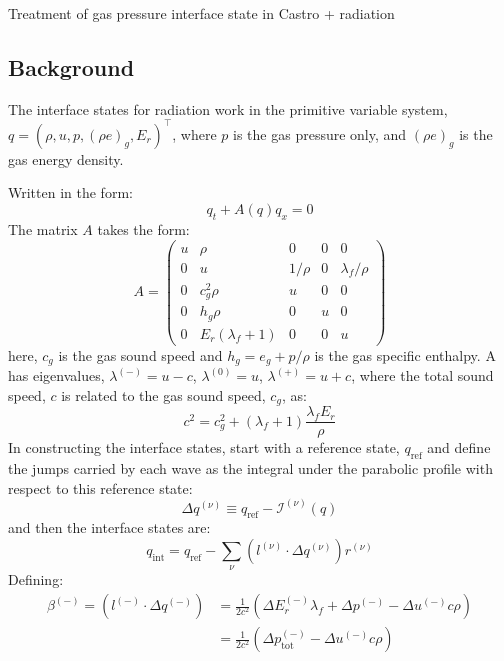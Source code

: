\documentclass[12pt]{article}
\newcommand{\nup}{{(\nu)}}
\newcommand{\evm}{{(-)}}
\newcommand{\evz}{{(0)}}
\newcommand{\evp}{{(+)}}
\begin{document}
\begin{center}
{\Large Treatment of gas pressure interface state in Castro + radiation}
\end{center}

\subsection*{Background}

The interface states for radiation work in the primitive variable
system, $q = (\rho, u, p, (\rho e)_g, E_r)^\intercal$, where $p$ is
the gas pressure only, and $(\rho e)_g$ is the gas energy density.

Written in the form:
\begin{equation}
q_t + A(q) q_x = 0
\end{equation}
The matrix $A$ takes the form:
\begin{equation}
A = \left (
\begin{matrix}
u & \rho & 0 & 0 & 0\\
0 & u & {1}/{\rho} & 0 & \lambda_f/{\rho}\\
0 & c_{g}^{2} \rho & u & 0 & 0\\
0 & h_{g} \rho & 0 & u & 0\\
0 & E_{r} \left(\lambda_f + 1\right) & 0 & 0 & u
\end{matrix}\right )
\end{equation}
here, $c_g$ is the gas sound speed and $h_g = e_g + p/\rho$ is the 
gas specific enthalpy.
A has eigenvalues, $\lambda^\evm = u - c$, $\lambda^\evz = u$, 
$\lambda^\evp = u + c$, where the total sound speed, $c$ is related
to the gas sound speed, $c_g$, as:
\begin{equation}
c^2 = c_g^2 + (\lambda_f + 1)\frac{\lambda_f E_r}{\rho}
\end{equation}
In constructing the interface states, start with a reference state,
$q_\mathrm{ref}$ and define the jumps carried by each wave as the
integral under the parabolic profile with respect to this reference
state:
\begin{equation}
\Delta q^\nup \equiv q_\mathrm{ref} - \mathcal{I}^\nup(q)
\end{equation}
and then the interface states are:
\begin{equation}
q_\mathrm{int} = q_\mathrm{ref} - \sum_\nu (l^\nup \cdot \Delta q^\nup) r^\nup
\end{equation}
Defining:
\begin{align}
\beta^\evm = ( l^\evm \cdot \Delta q^\evm ) &= \frac{1}{2 c^{2}} \left(
    \Delta E_r^\evm \lambda_f + \Delta p^\evm - \Delta u^\evm c \rho\right)\\
&= \frac{1}{2 c^{2}} \left(
    \Delta p_\mathrm{tot}^\evm - \Delta u^\evm c \rho\right)
\end{align}
\end{document}
